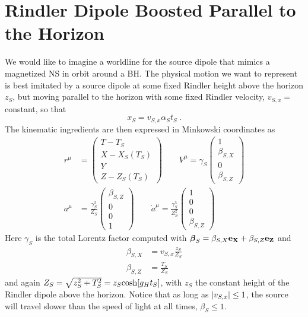 \section{Rindler Dipole Boosted Parallel to the Horizon}
\label{c}
We would like to imagine a worldline for the source dipole that
mimics a magnetized NS in orbit around a BH. The
physical motion we want to represent
is best imitated by a source dipole at some fixed Rindler height above
the horizon $z_S$, but 
moving
parallel to the horizon with some fixed Rindler velocity, $v_{S,x}=$constant, so that
\begin{equation}
x_S=v_{S,x} \alpha_S t_S
\ .
\label{vsx}
\end{equation}
The kinematic
ingredients are then expressed in Minkowski coordinates as
\begin{align}
r^{\mu} &=
\begin{pmatrix}
T-T_{S}\nonumber \\
X - X_S (T_S) \nonumber \\
Y \nonumber \\
Z- Z_S(T_S)
\end{pmatrix}  \nonumber \qquad
V^{\mu}  = \gamma_S
\begin{pmatrix}
1   \\
\beta_{S,X}  \\
0 \\
\beta_{S,Z}
\end{pmatrix} \nonumber \\
a^{\mu} &= \frac{\gamma^2_S}{Z_S}
\begin{pmatrix}
\beta_{S,Z} \\
0 \\
0  \\
1
\end{pmatrix} \qquad
\dot{a}^{\mu} = \frac{\gamma^3_S}{Z^2_S }
\begin{pmatrix}
1 \nonumber \\
0 \nonumber \\
0 \nonumber \\
\beta_{S,Z}
\end{pmatrix} 
\end{align}
Here $\gamma_S$ is the total Lorentz factor computed with
${\boldsymbol \beta}_S=\beta_{S,X} {\bf{e_X}} + \beta_{S,Z} {\bf{e_Z}}$ and
\begin{align}
\beta_{S,X}&={v_{S,x}}\frac{z_S}{Z_S} \nonumber \\
\beta_{S,Z}&=\frac{T_S}{Z_S}
\end{align}
and again
$Z_S= \sqrt{z^2_S + T^2_S}=z_S \hbox{cosh}[g_H t_S]$, with $z_S$ 
the constant height of the Rindler dipole above the horizon. 
Notice that as long as $|v_{S, x}|\le 1$, the source will
travel slower than the speed of light at all times, $\beta_S \le 1$.


